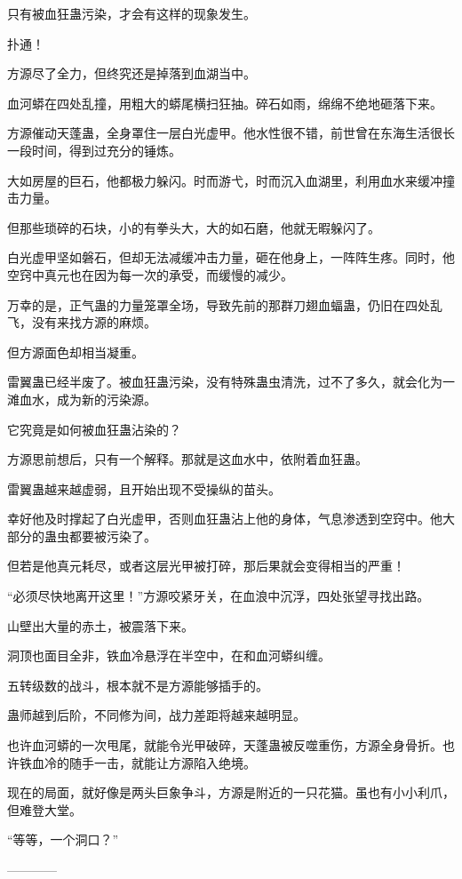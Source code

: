\begin{this_body}
只有被血狂蛊污染，才会有这样的现象发生。

扑通！

方源尽了全力，但终究还是掉落到血湖当中。

血河蟒在四处乱撞，用粗大的蟒尾横扫狂抽。碎石如雨，绵绵不绝地砸落下来。

方源催动天蓬蛊，全身罩住一层白光虚甲。他水性很不错，前世曾在东海生活很长一段时间，得到过充分的锤炼。

大如房屋的巨石，他都极力躲闪。时而游弋，时而沉入血湖里，利用血水来缓冲撞击力量。

但那些琐碎的石块，小的有拳头大，大的如石磨，他就无暇躲闪了。

白光虚甲坚如磐石，但却无法减缓冲击力量，砸在他身上，一阵阵生疼。同时，他空窍中真元也在因为每一次的承受，而缓慢的减少。

万幸的是，正气蛊的力量笼罩全场，导致先前的那群刀翅血蝠蛊，仍旧在四处乱飞，没有来找方源的麻烦。

但方源面色却相当凝重。

雷翼蛊已经半废了。被血狂蛊污染，没有特殊蛊虫清洗，过不了多久，就会化为一滩血水，成为新的污染源。

它究竟是如何被血狂蛊沾染的？

方源思前想后，只有一个解释。那就是这血水中，依附着血狂蛊。

雷翼蛊越来越虚弱，且开始出现不受操纵的苗头。

幸好他及时撑起了白光虚甲，否则血狂蛊沾上他的身体，气息渗透到空窍中。他大部分的蛊虫都要被污染了。

但若是他真元耗尽，或者这层光甲被打碎，那后果就会变得相当的严重！

“必须尽快地离开这里！”方源咬紧牙关，在血浪中沉浮，四处张望寻找出路。

山壁出大量的赤土，被震落下来。

洞顶也面目全非，铁血冷悬浮在半空中，在和血河蟒纠缠。

五转级数的战斗，根本就不是方源能够插手的。

蛊师越到后阶，不同修为间，战力差距将越来越明显。

也许血河蟒的一次甩尾，就能令光甲破碎，天蓬蛊被反噬重伤，方源全身骨折。也许铁血冷的随手一击，就能让方源陷入绝境。

现在的局面，就好像是两头巨象争斗，方源是附近的一只花猫。虽也有小小利爪，但难登大堂。

“等等，一个洞口？”

------------

\end{this_body}

